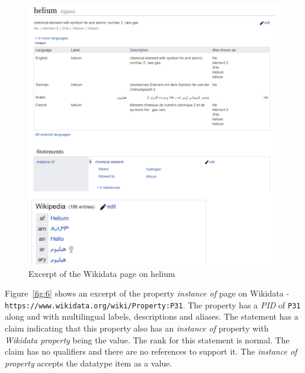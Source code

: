 \begin{figure}[hp]
  \centering
  \includegraphics[width=\linewidth]{images/helium_new.pdf}
  \caption{Excerpt of the Wikidata page on helium}
  \label{fig:5}
\end{figure}

Figure~\ref{fig:6} shows an excerpt of the property \textit{instance of} page on Wikidata - \texttt{https://www.wikidata.org/wiki/Property:P31}. The property has a \textit{PID} of \texttt{P31} along and with multilingual labels, descriptions and aliases. The statement has a claim indicating that this property also has an \textit{instance of} property with \textit{Wikidata property} being the value. The rank for this statement is normal. The claim has no qualifiers and there are no references to support it. The \textit{instance of property} accepts the datatype item as a value. 


